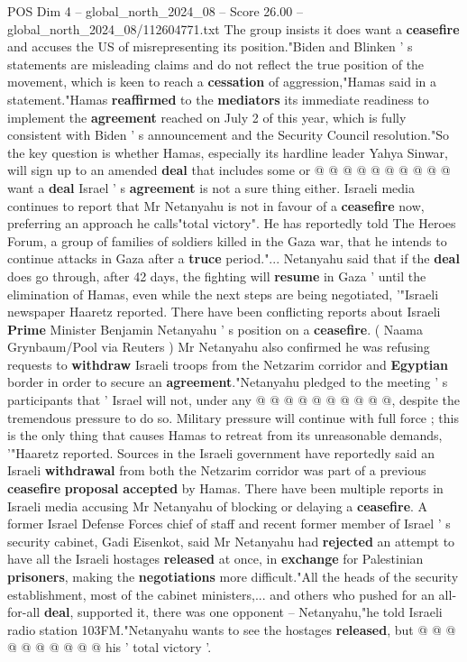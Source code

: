 \begin{textsample}{POS Dim 4 – global\_north\_2024\_08 – Score 26.00 – global\_north\_2024\_08/112604771.txt}
The group insists it does want a \textbf{ceasefire} and accuses the US of misrepresenting its position."Biden and Blinken ' s statements are misleading claims and do not reflect the true position of the movement, which is keen to reach a \textbf{cessation} of aggression,"Hamas said in a statement."Hamas \textbf{reaffirmed} to the \textbf{mediators} its immediate readiness to implement the \textbf{agreement} reached on July 2 of this year, which is fully consistent with Biden ' s announcement and the Security Council resolution."So the key question is whether Hamas, especially its hardline leader Yahya Sinwar, will sign up to an amended \textbf{deal} that includes some or @ @ @ @ @ @ @ @ @ @ want a \textbf{deal} Israel ' s \textbf{agreement} is not a sure thing either.
Israeli media continues to report that Mr Netanyahu is not in favour of a \textbf{ceasefire} now, preferring an approach he calls"total victory".
He has reportedly told The Heroes Forum, a group of families of soldiers killed in the Gaza war, that he intends to continue attacks in Gaza after a \textbf{truce} period."...
Netanyahu said that if the \textbf{deal} does go through, after 42 days, the fighting will \textbf{resume} in Gaza ' until the elimination of Hamas, even while the next steps are being negotiated, '"Israeli newspaper Haaretz reported.
There have been conflicting reports about Israeli \textbf{Prime} Minister Benjamin Netanyahu ' s position on a \textbf{ceasefire}. ( Naama Grynbaum/Pool via Reuters ) Mr Netanyahu also confirmed he was refusing requests to \textbf{withdraw} Israeli troops from the Netzarim corridor and \textbf{Egyptian} border in order to secure an \textbf{agreement}."Netanyahu pledged to the meeting ' s participants that ' Israel will not, under any @ @ @ @ @ @ @ @ @ @, despite the tremendous pressure to do so.
Military pressure will continue with full force ; this is the only thing that causes Hamas to retreat from its unreasonable demands, '"Haaretz reported.
Sources in the Israeli government have reportedly said an Israeli \textbf{withdrawal} from both the Netzarim corridor was part of a previous \textbf{ceasefire} \textbf{proposal} \textbf{accepted} by Hamas.
There have been multiple reports in Israeli media accusing Mr Netanyahu of blocking or delaying a \textbf{ceasefire}.
A former Israel Defense Forces chief of staff and recent former member of Israel ' s security cabinet, Gadi Eisenkot, said Mr Netanyahu had \textbf{rejected} an attempt to have all the Israeli hostages \textbf{released} at once, in \textbf{exchange} for Palestinian \textbf{prisoners}, making the \textbf{negotiations} more difficult."All the heads of the security establishment, most of the cabinet ministers,... and others who pushed for an all-for-all \textbf{deal}, supported it, there was one opponent -- Netanyahu,"he told Israeli radio station 103FM."Netanyahu wants to see the hostages \textbf{released}, but @ @ @ @ @ @ @ @ @ @ his ' total victory '.

\end{textsample}
